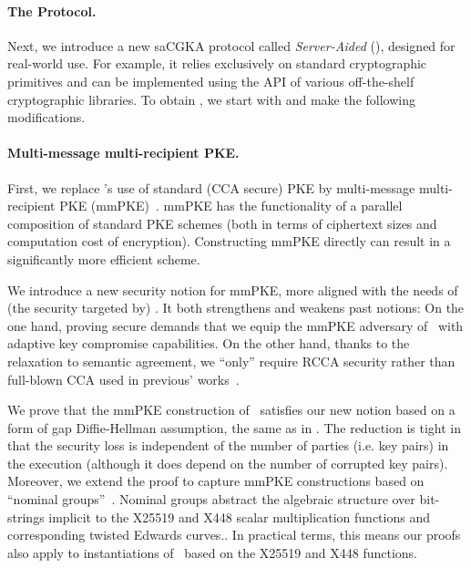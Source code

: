 \paragraph{The \saik Protocol.}
Next, we introduce a new saCGKA protocol called
\emph{Server-Aided \protITK} (\saik), designed for real-world use.
For example, it relies exclusively on standard cryptographic primitives and
can be implemented using the API of various off-the-shelf cryptographic
libraries. To obtain \saik, we start with \protITK and make the following
modifications.

\paragraph{Multi-message multi-recipient PKE.} First, we
replace \protITK's use of standard (CCA secure) PKE by multi-message
multi-recipient PKE (mmPKE)~\cite{ASIACCS:PinPoeSch14}.
mmPKE has the functionality of a parallel composition of standard PKE
schemes (both in terms of ciphertext sizes and computation cost of encryption).
Constructing mmPKE directly  can result in a significantly more efficient
scheme.

We introduce a new security notion for mmPKE, more aligned with the needs of
(the security targeted by) \saik. It both strengthens and weakens past
notions: On the one hand, proving \saik secure demands that we equip the
mmPKE adversary of~\cite{ASIACCS:PinPoeSch14} with adaptive key compromise
capabilities. On the other hand, thanks to the relaxation to semantic
agreement, we ``only'' require RCCA
security rather than full-blown CCA used in previous'
works~\cite{TCC:ACJM20,EPRINT:AlwJosMul20}.

We prove that the mmPKE construction of~\cite{ASIACCS:PinPoeSch14} satisfies our
new notion based on a form of gap Diffie-Hellman assumption, the same as in
\cite{ASIACCS:PinPoeSch14}. The reduction is tight in that the security loss
is independent of the number of parties (i.e. key pairs) in the execution
(although it does depend on the number of corrupted key pairs). Moreover, we
extend the proof to capture mmPKE constructions based on ``nominal
groups''~\cite{EC:ABHKLR21_2}. Nominal groups abstract the algebraic
structure over bit-strings implicit to the X25519 and X448 scalar
multiplication functions and corresponding twisted Edwards
curves.\cite{rfc7748}. In practical terms, this means our proofs also apply
to instantiations of~\cite{ASIACCS:PinPoeSch14} based on the X25519
and X448 functions.

